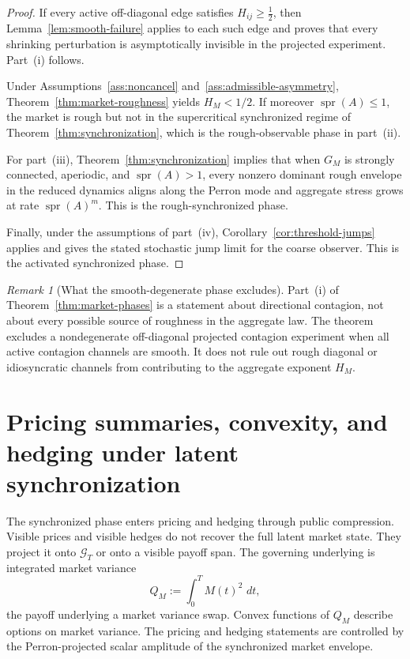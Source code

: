 \documentclass[11pt,a4paper]{amsart}
\theoremstyle{plain}
\theoremstyle{definition}
\theoremstyle{remark}
\newtheorem{remark}[theorem]{Remark}
\DeclareMathOperator{\spr}{spr}
\newcommand{\dd}{\,d}
\newcommand{\cG}{\mathcal{G}}
\begin{document}
\begin{proof}
If every active off-diagonal edge satisfies \(H_{ij}\ge\tfrac12\), then
Lemma~\ref{lem:smooth-failure} applies to each such edge and proves that every shrinking
perturbation is asymptotically invisible in the projected experiment.  Part~(i) follows.

Under Assumptions~\ref{ass:noncancel} and~\ref{ass:admissible-asymmetry},
Theorem~\ref{thm:market-roughness} yields \(H_M<1/2\).  If moreover \(\spr(A)\le1\), the market
is rough but not in the supercritical synchronized regime of Theorem~\ref{thm:synchronization},
which is the rough-observable phase in part~(ii).

For part~(iii), Theorem~\ref{thm:synchronization} implies that when \(G_M\) is strongly connected,
aperiodic, and \(\spr(A)>1\), every nonzero dominant rough envelope in the reduced dynamics aligns
along the Perron mode and aggregate stress grows at rate \(\spr(A)^m\).  This is the
rough-synchronized phase.

Finally, under the assumptions of part~(iv), Corollary~\ref{cor:threshold-jumps} applies and gives
the stated stochastic jump limit for the coarse observer.  This is the activated synchronized
phase.
\end{proof}

\begin{remark}[What the smooth-degenerate phase excludes]
Part~(i) of Theorem~\ref{thm:market-phases} is a statement about directional contagion, not about
every possible source of roughness in the aggregate law.  The theorem excludes a nondegenerate
off-diagonal projected contagion experiment when all active contagion channels are smooth.  It does
not rule out rough diagonal or idiosyncratic channels from contributing to the aggregate exponent
\(H_M\).
\end{remark}

\section{Pricing summaries, convexity, and hedging under latent synchronization}\label{sec:implications}

The synchronized phase enters pricing and hedging through public compression.  Visible prices and
visible hedges do not recover the full latent market state.  They project it onto \(\cG_T\) or onto
a visible payoff span.  The governing underlying is integrated market variance
\[
        Q_M
        :=
        \int_0^T M(t)^2\,\dd t,
\]
the payoff underlying a market variance swap.  Convex functions of \(Q_M\) describe options on
market variance.  The pricing and hedging statements are controlled by the Perron-projected scalar
amplitude of the synchronized market envelope.
\end{document}
